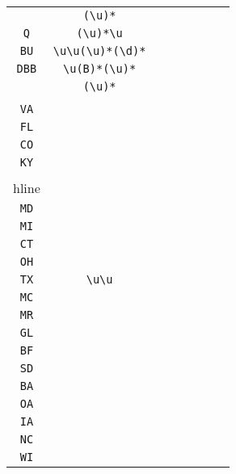 \begin{longtable}{cccccccc}
\begin{tabular}{ll}
    \verb|U| & \verb|(\u)*|\\
\verb|Q| & \verb|(\u)*\u|\\
\verb|BU| & \verb|\u\u(\u)*(\d)*|\\
\verb|DBB| & \verb|\u(B)*(\u)*|\\
\verb|| & \verb|(\u)*|
\end{tabular}
\\\midrule 
\begin{tabular}{l}
    \verb|CA|\\
\verb|VA|\\
\verb|FL|\\
\verb|CO|\\
\verb|KY|\\
\\hline\\
\verb|MD|\\
\verb|MI|\\
\verb|CT|\\
\verb|OH|\\
\verb|TX|
\end{tabular}

&
\verb|\u\u|
&

\begin{tabular}{l}
    \verb|\u\u|\\
\verb|MC|\\
\verb|MR|\\
\verb|GL|\\
\verb|BF|\\
\verb|SD|
\end{tabular}

&

\begin{tabular}{l}
    \verb.\u(A)|(\u).\\
\verb|BA|\\
\verb|OA|\\
\verb|IA|\\
\verb|NC|\\
\verb|WI|
\end{tabular}

&


\end{longtable}
